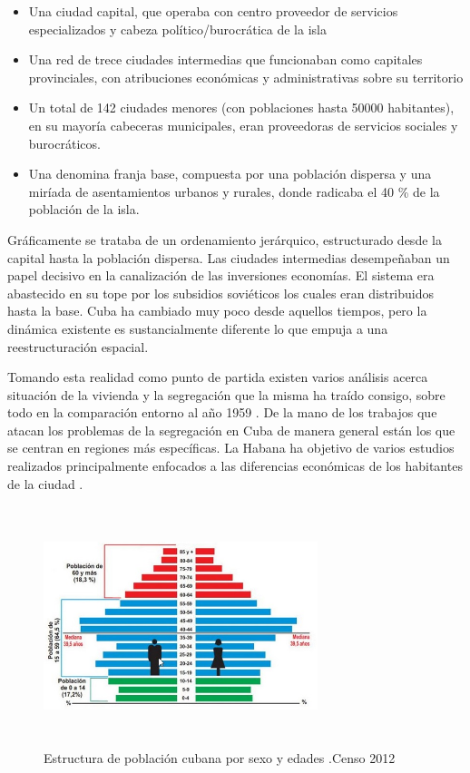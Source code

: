 \begin{itemize}
	
	\item Una ciudad capital, que operaba con centro proveedor de servicios especializados y cabeza político/burocrática de la isla
	
	\item Una red de trece ciudades intermedias que funcionaban como capitales provinciales, con atribuciones económicas y administrativas sobre su territorio
	\item Un total de 142 ciudades menores (con poblaciones hasta 50000 habitantes), en su mayoría cabeceras municipales, eran proveedoras de servicios sociales y burocráticos.
	\item Una denomina franja base, compuesta por una población dispersa y una miríada de asentamientos urbanos y rurales, donde radicaba el 40 \% de la población de la isla.
	
	
	
\end{itemize}

Gráficamente se trataba de un ordenamiento jerárquico, estructurado desde la capital hasta la población dispersa. Las ciudades intermedias desempeñaban un papel decisivo en la canalización de las inversiones economías. El sistema era abastecido en su tope por los subsidios soviéticos los cuales eran distribuidos hasta la base. Cuba ha cambiado muy poco desde aquellos tiempos, pero la dinámica existente es sustancialmente diferente lo que empuja a una reestructuración espacial.

Tomando esta realidad como punto de partida existen varios análisis acerca situación de la vivienda y la segregación que la misma ha traído consigo, sobre todo en la comparación entorno al año 1959 \cite{Trefftz201150AD} \cite{Pascua2006LasZR}. De la mano de los trabajos que atacan los problemas de la segregación en Cuba de manera general están los que se centran en regiones más específicas. La Habana ha objetivo de varios estudios realizados principalmente enfocados a las diferencias económicas de los habitantes de la ciudad \cite{Herrero2007PlanesDR} \cite{Alfonso2008LaRE}.

\begin{figure}[htb]
	\centering
	\includegraphics[width=8cm, height=7cm]{Images/CubaEnvejecimiento.jpg} 
	\caption{Estructura de población cubana por sexo y edades .Censo 2012 }
\end{figure}

